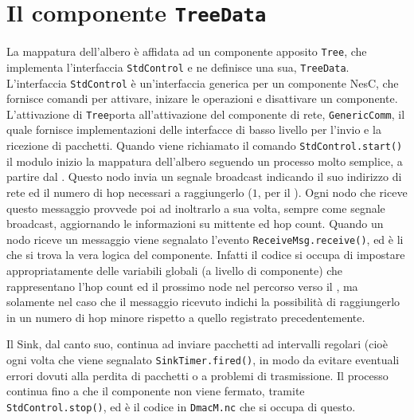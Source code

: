 \documentclass[twoside,11pt,a4paper,italian,openany]{book}
\begin{document}
\newcommand{\treedata}{\texttt{TreeData}}
\newcommand{\tree}{\texttt{Tree}}

\section{Il componente \treedata}
La mappatura dell'albero è affidata ad un componente apposito \tree, che implementa l'interfaccia
\texttt{StdControl} e ne definisce una sua, \treedata.
L'interfaccia \texttt{StdControl} è un'interfaccia generica per un componente NesC, che fornisce 
comandi per attivare, inizare le operazioni e disattivare un componente.
L'attivazione di \tree porta all'attivazione del componente di rete, \texttt{GenericComm}, 
il quale fornisce implementazioni delle interfacce di basso livello per l'invio e la ricezione 
di pacchetti. 
Quando viene richiamato il comando \texttt{StdControl.start()} il modulo inizio la mappatura 
dell'albero seguendo un processo molto semplice, a partire dal \sink. 
Questo nodo invia un segnale broadcast indicando il suo indirizzo di rete ed il numero di hop 
necessari a raggiungerlo ($1$, per il \sink). Ogni nodo che riceve questo messaggio provvede 
poi ad inoltrarlo a sua volta, sempre come segnale broadcast, aggiornando le
informazioni su mittente ed hop count. 
Quando un nodo riceve un messaggio viene segnalato l'evento 
\texttt{ReceiveMsg.receive()}, ed è li che si trova la vera logica del componente. 
Infatti il codice si occupa di impostare appropriatamente delle variabili globali 
(a livello di componente) che rappresentano l'hop count ed il prossimo node nel percorso verso 
il \sink, ma solamente nel caso che il messaggio ricevuto indichi la possibilità di raggiungerlo
in un numero di hop minore rispetto a quello registrato precedentemente. 

Il Sink, dal canto suo, continua ad inviare pacchetti ad intervalli regolari (cioè ogni volta 
che viene segnalato \texttt{SinkTimer.fired()}, in modo da evitare eventuali errori dovuti alla 
perdita di pacchetti o a problemi di trasmissione.
Il processo continua fino a che il componente non viene fermato, tramite 
\texttt{StdControl.stop()}, ed è il codice in \texttt{DmacM.nc} che si occupa di questo.
\end{document}
